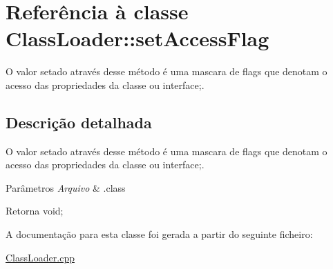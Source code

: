 \hypertarget{class_class_loader_1_1set_access_flag}{}\section{Referência à classe Class\+Loader\+:\+:set\+Access\+Flag}
\label{class_class_loader_1_1set_access_flag}


O valor setado através desse método é uma mascara de flags que denotam o acesso das propriedades da classe ou interface;.  




\subsection{Descrição detalhada}
O valor setado através desse método é uma mascara de flags que denotam o acesso das propriedades da classe ou interface;. 


\begin{DoxyParams}{Parâmetros}
{\em Arquivo} & .class \\
\hline
\end{DoxyParams}
\begin{DoxyReturn}{Retorna}
void; 
\end{DoxyReturn}


A documentação para esta classe foi gerada a partir do seguinte ficheiro\+:\begin{DoxyCompactItemize}
\item 
\hyperlink{_class_loader_8cpp}{Class\+Loader.\+cpp}\end{DoxyCompactItemize}
